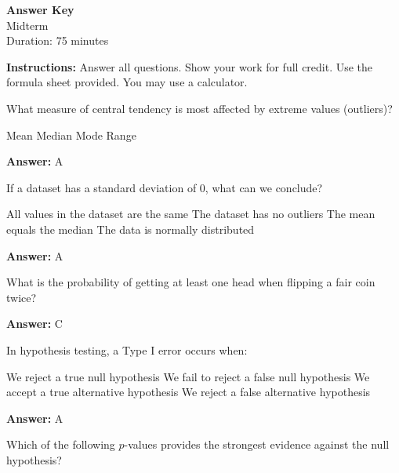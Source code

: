 \documentclass[11pt,letterpaper]{exam}
\begin{document}
\begin{center}
\LARGE \textbf{Answer Key} \\
\large Midterm \\
\normalsize Duration: 75 minutes
\end{center}

\noindent \textbf{Instructions:} Answer all questions. Show your work for full credit. Use the formula sheet provided. You may use a calculator.

\vspace{0.25in}

\begin{questions}

\question[5] What measure of central tendency is most affected by extreme values (outliers)?

\begin{choices}
  \correctchoice Mean
  \choice Median
  \choice Mode
  \choice Range
\end{choices}

\textbf{Answer:} A


\question[5] If a dataset has a standard deviation of 0, what can we conclude?

\begin{choices}
  \correctchoice All values in the dataset are the same
  \choice The dataset has no outliers
  \choice The mean equals the median
  \choice The data is normally distributed
\end{choices}

\textbf{Answer:} A


\question[8] What is the probability of getting at least one head when flipping a fair coin twice?

\begin{choices}
\end{choices}

\textbf{Answer:} C


\question[8] In hypothesis testing, a Type I error occurs when:

\begin{choices}
  \correctchoice We reject a true null hypothesis
  \choice We fail to reject a false null hypothesis
  \choice We accept a true alternative hypothesis
  \choice We reject a false alternative hypothesis
\end{choices}

\textbf{Answer:} A


\question[5] Which of the following $p$-values provides the strongest evidence against the null hypothesis?


\end{questions}
\end{document}

